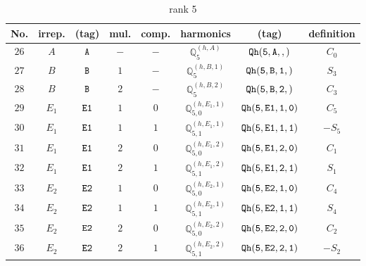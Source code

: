 \documentclass[fleqn,8pt]{jsarticle}
\begin{document}
\begin{table}[ht!]
\begin{center}
\caption{rank 5}
\renewcommand{\arraystretch}{1.3}
\begin{tabular}{cccccccc} \hline \hline
No. & irrep. & (tag) & mul. & comp. & harmonics & (tag) & definition \\ \hline
$ 26 $ & $ A $ & $ {\tt A} $ & $ - $ & $ - $ & $ \mathbb{Q}_{5}^{(h,A)} $ & $ {\tt Qh(5,A,,)} $ & $ C_{0} $ \\
$ 27 $ & $ B $ & $ {\tt B} $ & $ 1 $ & $ - $ & $ \mathbb{Q}_{5}^{(h,B,1)} $ & $ {\tt Qh(5,B,1,)} $ & $ S_{3} $ \\
$ 28 $ & $ B $ & $ {\tt B} $ & $ 2 $ & $ - $ & $ \mathbb{Q}_{5}^{(h,B,2)} $ & $ {\tt Qh(5,B,2,)} $ & $ C_{3} $ \\
$ 29 $ & $ E_{1} $ & $ {\tt E1} $ & $ 1 $ & $ 0 $ & $ \mathbb{Q}_{5,0}^{(h,E_{1},1)} $ & $ {\tt Qh(5,E1,1,0)} $ & $ C_{5} $ \\
$ 30 $ & $ E_{1} $ & $ {\tt E1} $ & $ 1 $ & $ 1 $ & $ \mathbb{Q}_{5,1}^{(h,E_{1},1)} $ & $ {\tt Qh(5,E1,1,1)} $ & $ - S_{5} $ \\
$ 31 $ & $ E_{1} $ & $ {\tt E1} $ & $ 2 $ & $ 0 $ & $ \mathbb{Q}_{5,0}^{(h,E_{1},2)} $ & $ {\tt Qh(5,E1,2,0)} $ & $ C_{1} $ \\
$ 32 $ & $ E_{1} $ & $ {\tt E1} $ & $ 2 $ & $ 1 $ & $ \mathbb{Q}_{5,1}^{(h,E_{1},2)} $ & $ {\tt Qh(5,E1,2,1)} $ & $ S_{1} $ \\
$ 33 $ & $ E_{2} $ & $ {\tt E2} $ & $ 1 $ & $ 0 $ & $ \mathbb{Q}_{5,0}^{(h,E_{2},1)} $ & $ {\tt Qh(5,E2,1,0)} $ & $ C_{4} $ \\
$ 34 $ & $ E_{2} $ & $ {\tt E2} $ & $ 1 $ & $ 1 $ & $ \mathbb{Q}_{5,1}^{(h,E_{2},1)} $ & $ {\tt Qh(5,E2,1,1)} $ & $ S_{4} $ \\
$ 35 $ & $ E_{2} $ & $ {\tt E2} $ & $ 2 $ & $ 0 $ & $ \mathbb{Q}_{5,0}^{(h,E_{2},2)} $ & $ {\tt Qh(5,E2,2,0)} $ & $ C_{2} $ \\
$ 36 $ & $ E_{2} $ & $ {\tt E2} $ & $ 2 $ & $ 1 $ & $ \mathbb{Q}_{5,1}^{(h,E_{2},2)} $ & $ {\tt Qh(5,E2,2,1)} $ & $ - S_{2} $ \\
 \hline \hline
\end{tabular}
\end{center}
\end{table}
\end{document}
